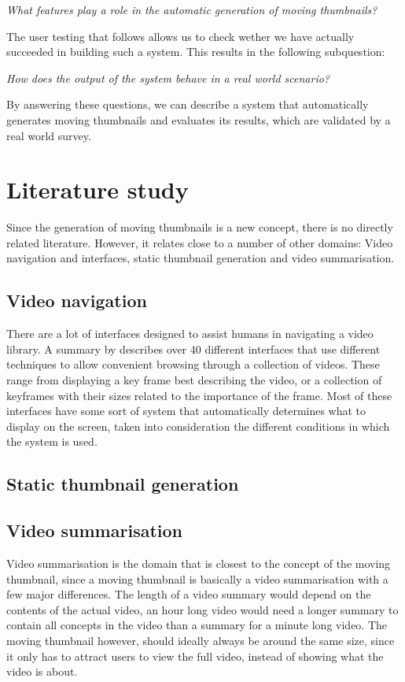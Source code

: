 \documentclass{../resources/acm_proc_article-sp}
\begin{document}
\textit{What features play a role in the automatic generation of moving thumbnails?}

The user testing that follows allows us to check wether we have actually succeeded in building such a system. This results in the following subquestion:

\textit{How does the output of the system behave in a real world scenario?}

By answering these questions, we can describe a system that automatically generates moving thumbnails and evaluates its results, which are validated by a real world survey.

\section{Literature study}

Since the generation of moving thumbnails is a new concept, there is no directly related literature. However, it relates close to a number of other domains: Video navigation and interfaces, static thumbnail generation and video summarisation.

\subsection{Video navigation}

There are a lot of interfaces designed to assist humans in navigating a video library. A summary by \textcite{Schoeffmann:2010iw} describes over 40 different interfaces that use different techniques to allow convenient browsing through a collection of videos. These range from displaying a key frame best describing the video, or a collection of keyframes with their sizes related to the importance of the frame. Most of these interfaces have some sort of system that automatically determines what to display on the screen, taken into consideration the different conditions in which the system is used.


\subsection{Static thumbnail generation}

\subsection{Video summarisation}

Video summarisation is the domain that is closest to the concept of the moving thumbnail, since a moving thumbnail is basically a video summarisation with a few major differences. The length of a video summary would depend on the contents of the actual video, an hour long video would need a longer summary to contain all concepts in the video than a summary for a minute long video. The moving thumbnail however, should ideally always be around the same size, since it only has to attract users to view the full video, instead of showing what the video is about.
\end{document}
